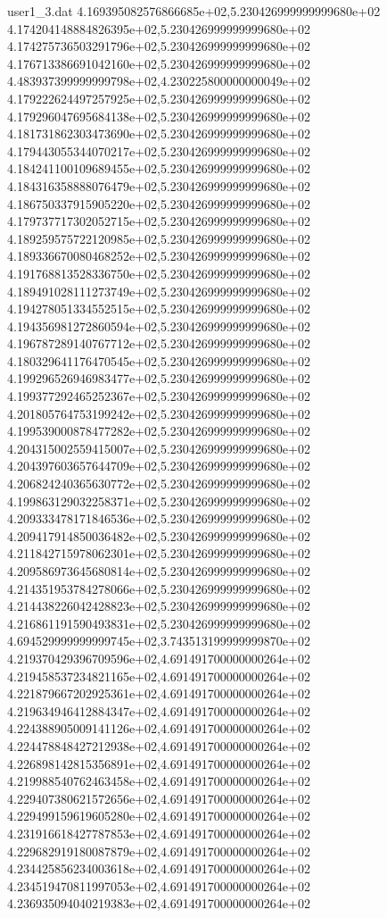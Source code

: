 \begin{filecontents}{user1_3.dat}
4.169395082576866685e+02,5.230426999999999680e+02
4.174204148884826395e+02,5.230426999999999680e+02
4.174275736503291796e+02,5.230426999999999680e+02
4.176713386691042160e+02,5.230426999999999680e+02
4.483937399999999798e+02,4.230225800000000049e+02
4.179222624497257925e+02,5.230426999999999680e+02
4.179296047695684138e+02,5.230426999999999680e+02
4.181731862303473690e+02,5.230426999999999680e+02
4.179443055344070217e+02,5.230426999999999680e+02
4.184241100109689455e+02,5.230426999999999680e+02
4.184316358888076479e+02,5.230426999999999680e+02
4.186750337915905220e+02,5.230426999999999680e+02
4.179737717302052715e+02,5.230426999999999680e+02
4.189259575722120985e+02,5.230426999999999680e+02
4.189336670080468252e+02,5.230426999999999680e+02
4.191768813528336750e+02,5.230426999999999680e+02
4.189491028111273749e+02,5.230426999999999680e+02
4.194278051334552515e+02,5.230426999999999680e+02
4.194356981272860594e+02,5.230426999999999680e+02
4.196787289140767712e+02,5.230426999999999680e+02
4.180329641176470545e+02,5.230426999999999680e+02
4.199296526946983477e+02,5.230426999999999680e+02
4.199377292465252367e+02,5.230426999999999680e+02
4.201805764753199242e+02,5.230426999999999680e+02
4.199539000878477282e+02,5.230426999999999680e+02
4.204315002559415007e+02,5.230426999999999680e+02
4.204397603657644709e+02,5.230426999999999680e+02
4.206824240365630772e+02,5.230426999999999680e+02
4.199863129032258371e+02,5.230426999999999680e+02
4.209333478171846536e+02,5.230426999999999680e+02
4.209417914850036482e+02,5.230426999999999680e+02
4.211842715978062301e+02,5.230426999999999680e+02
4.209586973645680814e+02,5.230426999999999680e+02
4.214351953784278066e+02,5.230426999999999680e+02
4.214438226042428823e+02,5.230426999999999680e+02
4.216861191590493831e+02,5.230426999999999680e+02
4.694529999999999745e+02,3.743513199999999870e+02
4.219370429396709596e+02,4.691491700000000264e+02
4.219458537234821165e+02,4.691491700000000264e+02
4.221879667202925361e+02,4.691491700000000264e+02
4.219634946412884347e+02,4.691491700000000264e+02
4.224388905009141126e+02,4.691491700000000264e+02
4.224478848427212938e+02,4.691491700000000264e+02
4.226898142815356891e+02,4.691491700000000264e+02
4.219988540762463458e+02,4.691491700000000264e+02
4.229407380621572656e+02,4.691491700000000264e+02
4.229499159619605280e+02,4.691491700000000264e+02
4.231916618427787853e+02,4.691491700000000264e+02
4.229682919180087879e+02,4.691491700000000264e+02
4.234425856234003618e+02,4.691491700000000264e+02
4.234519470811997053e+02,4.691491700000000264e+02
4.236935094040219383e+02,4.691491700000000264e+02

\end{filecontents}
